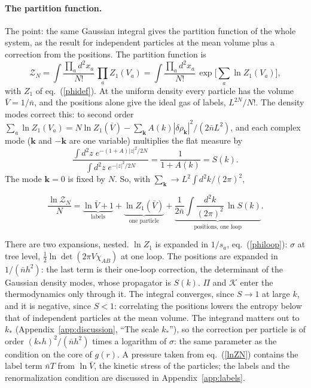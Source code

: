 \documentclass[11pt,aps,preprint,nofootinbib,superscriptaddress,tightenlines]{revtex4-2}
\def\st{\begin{equation}}
\def\stp{\end{equation}}
\def\Eq#1{eq.~(\ref{#1})}
\def\App#1{Appendix~\ref{#1}}
\let\oldparagraph\paragraph
\renewcommand{\paragraph}{\par\bigskip\oldparagraph}
\begin{document}
\paragraph{The partition function.}  The point: the same Gaussian integral gives the partition function of the whole system, as the result for
independent particles at the mean volume plus a correction from the positions.  The partition function is
\st
\mathcal Z_N=\int\frac{\prod_ad^2x_a}{N!}\,\prod_aZ_1(V_a)=\int\frac{\prod_ad^2x_a}{N!}\,\exp\Big[\sum_a\ln Z_1(V_a)\Big],
\stp
with $Z_1$ of \Eq{phidef}.  At the uniform density every particle has the volume $\bar V=1/\bar n$, and the positions alone give the ideal gas
of labels, $L^{2N}/N!$.  The density modes correct this: to second order $\sum_a\ln Z_1(V_a)=N\ln Z_1(\bar V)-\sum_{\bm k}A(k)|\delta\rho_{\bm k}|^2/(2\bar nL^2)$,
and each complex mode ($\bm k$ and $-\bm k$ are one variable) multiplies the flat measure by
\st
\frac{\int d^2z\;e^{-(1+A)|z|^2/2N}}{\int d^2z\;e^{-|z|^2/2N}}=\frac1{1+A(k)}=S(k) .
\stp
The mode $\bm k=0$ is fixed by $N$.  So, with $\sum_{\bm k}\to L^2\int d^2k/(2\pi)^2$,
\begin{keyeq}
\st
\frac{\ln\mathcal Z_N}{N}=\underbrace{\ln\bar V+1}_{\text{labels}}+\underbrace{\ln Z_1(\bar V)}_{\text{one particle}}
+\underbrace{\frac1{2\bar n}\int\frac{d^2k}{(2\pi)^2}\,\ln S(k)}_{\text{positions, one loop}} .
\label{lnZN}
\stp
\end{keyeq}
There are two expansions, nested.  $\ln Z_1$ is expanded in $1/s_a$, \Eq{philoop}: $\sigma$ at tree level, $\tfrac12\ln\det(2\pi V\chi_{AB})$ at one loop.
The positions are expanded in $1/(\bar nh^2)$: the last term is their one-loop correction, the determinant of the Gaussian density modes, whose
propagator is $S(k)$.  $\Pi$ and $\mathcal K$ enter the thermodynamics only through it.  The integral converges, since $S\to1$ at large $k$, and it is
negative, since $S<1$: correlating the positions lowers the entropy below that of independent particles at the mean volume.  The integrand matters out to
$k_*$ (\App{app:discussion}, ``The scale $k_*$''), so the correction per particle is of order $(k_*h)^2/(\bar nh^2)$ times a logarithm of $\sigma$: the same
parameter as the condition on the core of $g(r)$.  A pressure taken from \Eq{lnZN} contains the label term $\bar nT$ from $\ln\bar V$, the kinetic stress of the
particles; the labels and the renormalization condition are discussed in \App{app:labels}.
\end{document}

